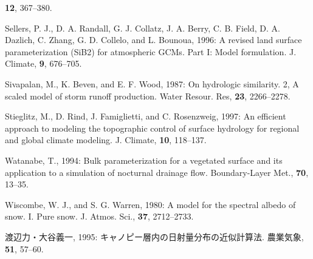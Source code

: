 \begin{description}
            {\bf 12}, 367--380.
 \item[] Sellers, P. J., D. A. Randall, G. J. Collatz, J. A. Berry,
            C. B. Field, D. A. Dazlich, C. Zhang, G. D. Collelo, and
            L. Bounoua, 1996: A revised land surface parameterization
            (SiB2) for atmospheric GCMs. Part I: Model formulation.
            {J. Climate}, {\bf 9}, 676--705.
 \item[] Sivapalan, M., K. Beven, and E. F. Wood, 1987: On hydrologic
            similarity. 2, A scaled model of storm runoff
            production. {Water Resour. Res}, {\bf 23}, 2266--2278.
 \item[] Stieglitz, M., D. Rind, J. Famiglietti, and C. Rosenzweig,
            1997: An efficient approach to modeling the topographic
            control of surface hydrology for regional and global climate
            modeling. {J. Climate}, {\bf 10}, 118--137.
 \item[] Watanabe, T., 1994: Bulk parameterization for a vegetated
            surface and its application to a simulation of nocturnal
            drainage flow. {Boundary-Layer Met.}, {\bf 70}, 13--35.
 \item[] Wiscombe, W. J., and S. G. Warren, 1980: A model for the
            spectral albedo of snow. I. Pure snow. {J. Atmos. Sci.},
            {\bf 37}, 2712--2733.
 \item[] 渡辺力・大谷義一, 1995: キャノピー層内の日射量分布の近似計算法.
            {農業気象}, {\bf 51}, 57--60.
\end{description}
